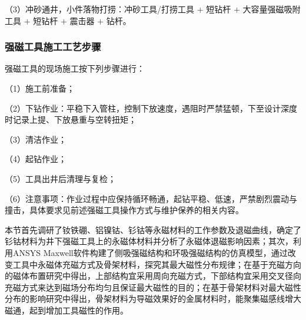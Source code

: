 （3）冲砂通井，小件落物打捞：冲砂工具/打捞工具 $+$ 短钻杆 $+$ 大容量强磁吸附工具 $+$ 短钻杆 $+$ 震击器 $+$ 钻杆。

\subsubsection{强磁工具施工工艺步骤}

强磁工具的现场施工按下列步骤进行：

（1）施工前准备；

（2）下钻作业：平稳下入管柱，控制下放速度，遇阻时严禁猛顿，下至设计深度时记录上提、下放悬重与空转扭矩；

（3）清洁作业；

（4）起钻作业；

（5）工具出井后清理与复检；

（6）注意事项：作业过程中应保持循环畅通，起钻平稳、低速，严禁剧烈震动与撞击，具体要求见前述强磁工具操作方式与维护保养的相关内容。




本节首先调研了钕铁硼、铝镍钴、钐钴等永磁材料的工作参数及退磁曲线，确定了钐钴材料为井下强磁工具上的永磁体材料并分析了永磁体退磁影响因素；其次，利用ANSYS Maxwell软件构建了侧吸强磁结构和环吸强磁结构的仿真模型，通过改变工具中永磁体充磁方式及骨架材料，探究其最大磁性分布规律；在基于充磁方向的磁体布置研究中得出，上部结构宜采用周向充磁方式，下部结构宜采用交叉径向充磁方式来达到磁场分布均匀且保证最大磁性的目的；在基于骨架材料对最大磁性分布的影响研究中得出，骨架材料为导磁效果好的金属材料时，能聚集磁感线增大磁通，起到增加工具磁性的作用。




























































